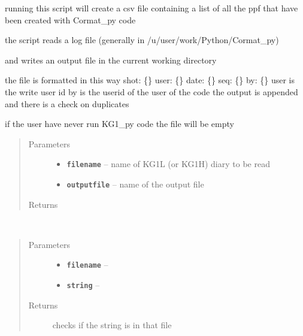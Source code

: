 \documentclass[letterpaper,10pt,english]{sphinxmanual}
\begin{document}

\begin{fulllineitems}
\label{library:library.extract_history}
running this script will create a csv file containing a list of all the
ppf that have been created with Cormat\_py code

the script reads a log file (generally in /u/user/work/Python/Cormat\_py)

and writes an output file in the current working directory

the file is formatted in this way
shot: \{\} user: \{\} date: \{\} seq: \{\} by: \{\}
user is the write user id
by is the userid of the user of the code
the output is appended and there is a check on duplicates

if the user have never run KG1\_py code the file will be empty
\begin{quote}\begin{description}
\item[{Parameters}] \leavevmode\begin{itemize}
\item {} 
\textbf{\texttt{filename}} -- name of KG1L (or KG1H) diary to be read

\item {} 
\textbf{\texttt{outputfile}} -- name of the output file

\end{itemize}

\item[{Returns}] \leavevmode


\end{description}\end{quote}

\end{fulllineitems}


\begin{fulllineitems}
\label{library:library.check_string_in_file}~\begin{quote}\begin{description}
\item[{Parameters}] \leavevmode\begin{itemize}
\item {} 
\textbf{\texttt{filename}} -- 

\item {} 
\textbf{\texttt{string}} -- 

\end{itemize}

\item[{Returns}] \leavevmode
checks if the string is in that file

\end{description}\end{quote}

\end{fulllineitems}
\end{document}

